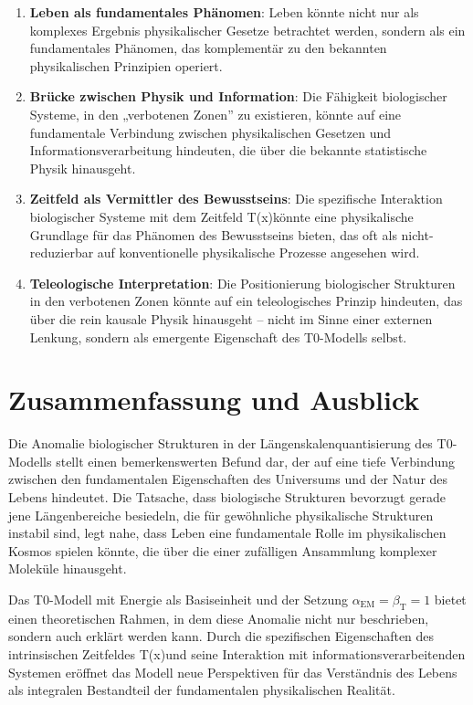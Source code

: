 \documentclass[12pt,a4paper]{article}
\newcommand{\Tfield}{T(x)}
\newcommand{\alphaEM}{\alpha_{\text{EM}}}
\newcommand{\betaT}{\beta_{\text{T}}}
\begin{document}
	\begin{enumerate}
		\item \textbf{Leben als fundamentales Phänomen}: Leben könnte nicht nur als komplexes Ergebnis physikalischer Gesetze betrachtet werden, sondern als ein fundamentales Phänomen, das komplementär zu den bekannten physikalischen Prinzipien operiert.
		
		\item \textbf{Brücke zwischen Physik und Information}: Die Fähigkeit biologischer Systeme, in den „verbotenen Zonen'' zu existieren, könnte auf eine fundamentale Verbindung zwischen physikalischen Gesetzen und Informationsverarbeitung hindeuten, die über die bekannte statistische Physik hinausgeht.
		
		\item \textbf{Zeitfeld als Vermittler des Bewusstseins}: Die spezifische Interaktion biologischer Systeme mit dem Zeitfeld \Tfield könnte eine physikalische Grundlage für das Phänomen des Bewusstseins bieten, das oft als nicht-reduzierbar auf konventionelle physikalische Prozesse angesehen wird.
		
		\item \textbf{Teleologische Interpretation}: Die Positionierung biologischer Strukturen in den verbotenen Zonen könnte auf ein teleologisches Prinzip hindeuten, das über die rein kausale Physik hinausgeht – nicht im Sinne einer externen Lenkung, sondern als emergente Eigenschaft des T0-Modells selbst.
	\end{enumerate}
	
	\section{Zusammenfassung und Ausblick}
	
	Die Anomalie biologischer Strukturen in der Längenskalenquantisierung des T0-Modells stellt einen bemerkenswerten Befund dar, der auf eine tiefe Verbindung zwischen den fundamentalen Eigenschaften des Universums und der Natur des Lebens hindeutet. Die Tatsache, dass biologische Strukturen bevorzugt gerade jene Längenbereiche besiedeln, die für gewöhnliche physikalische Strukturen instabil sind, legt nahe, dass Leben eine fundamentale Rolle im physikalischen Kosmos spielen könnte, die über die einer zufälligen Ansammlung komplexer Moleküle hinausgeht.
	
	Das T0-Modell mit Energie als Basiseinheit und der Setzung $\alphaEM = \betaT = 1$ bietet einen theoretischen Rahmen, in dem diese Anomalie nicht nur beschrieben, sondern auch erklärt werden kann. Durch die spezifischen Eigenschaften des intrinsischen Zeitfeldes \Tfield und seine Interaktion mit informationsverarbeitenden Systemen eröffnet das Modell neue Perspektiven für das Verständnis des Lebens als integralen Bestandteil der fundamentalen physikalischen Realität.
	
\end{document}
